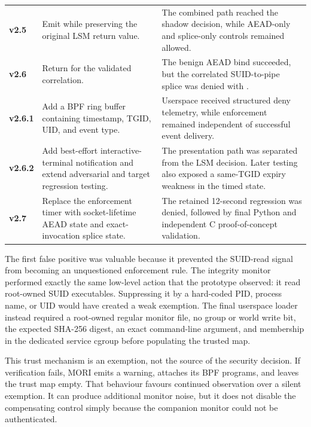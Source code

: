 \begin{table}[H]
\begin{tabularx}{\textwidth}{@{}>{\bfseries}p{}>{\raggedright\arraybackslash}p{}Y@{}}
        v2.5 & Emit \allowbreak
         while preserving the original LSM return value. &
        The combined path reached the shadow decision, while AEAD-only and
        splice-only controls remained allowed. \\

        v2.6 & Return  for the validated correlation. &
        The benign AEAD bind succeeded, but the correlated SUID-to-pipe splice
        was denied with . \\

        v2.6.1 & Add a BPF ring buffer containing timestamp, TGID, UID, and
        event type. &
        Userspace received structured deny telemetry, while enforcement
        remained independent of successful event delivery. \\

        v2.6.2 & Add best-effort interactive-terminal notification and extend
        adversarial and target regression testing. &
        The presentation path was separated from the LSM decision. Later
        testing also exposed a same-TGID expiry weakness in the timed state. \\

        v2.7 & Replace the enforcement timer with socket-lifetime AEAD state and
        exact-invocation splice state. &
        The retained 12-second regression was denied, followed by final Python
        and independent C proof-of-concept validation. \\
        \bottomrule
    \end{tabularx}
\end{table}

The first false positive was valuable because it prevented the SUID-read signal
from becoming an unquestioned enforcement rule. The integrity monitor performed
exactly the same low-level action that the prototype observed: it read
root-owned SUID executables. Suppressing it by a hard-coded PID, process name,
or UID would have created a weak exemption. The final userspace loader instead
required a root-owned regular monitor file, no group or world write bit, the
expected SHA-256 digest, an exact command-line argument, and membership in the
dedicated service cgroup before populating the trusted map.

This trust mechanism is an exemption, not the source of the security decision.
If verification fails, MORI emits a warning, attaches its BPF programs, and
leaves the trust map empty. That behaviour favours continued observation over a
silent exemption. It can produce additional monitor noise, but it does not
disable the compensating control simply because the companion monitor could not
be authenticated.

